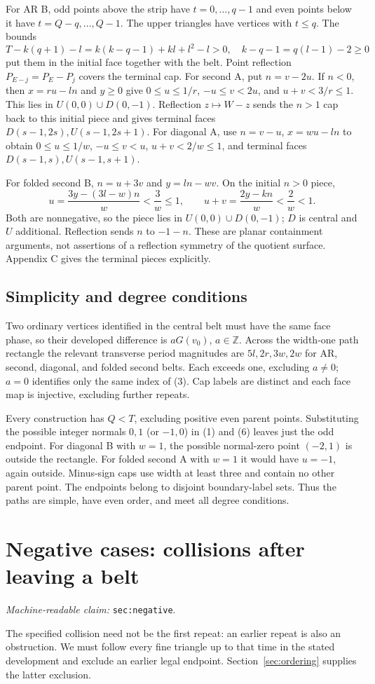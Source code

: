 \documentclass[11pt]{amsart}
\newcommand{\Z}{\mathbb Z}
\newcommand{\record}[1]{\nolinkurl{#1}}
\newcommand{\claimid}[1]{\par\nopagebreak\noindent\textit{Machine-readable claim:} \record{#1}.\par}
\begin{document}
For AR B, odd points above the strip have $t=0,\ldots,q-1$ and even
points below it have $t=Q-q,\ldots,Q-1$. The upper triangles have
vertices with $t\le q$. The bounds
\[
 T-k(q+1)-l=k(k-q-1)+kl+l^2-l>0,\quad
 k-q-1=q(l-1)-2\ge0
\]
put them in the initial face together with the belt. Point reflection
$P_{E-j}=P_E-P_j$ covers the terminal cap.
For second A, put $n=v-2u$. If $n<0$, then $x=ru-ln$ and $y\ge0$
give $0\le u\le1/r$, $-u\le v<2u$, and $u+v<3/r\le1$.
This lies in $U(0,0)\cup D(0,-1)$. Reflection $z\mapsto W-z$ sends
the $n>1$ cap back to this initial piece and gives terminal faces
$D(s-1,2s),U(s-1,2s+1)$.
For diagonal A, use $n=v-u$, $x=wu-ln$ to obtain
$0\le u\le1/w$, $-u\le v<u$, $u+v<2/w\le1$, and terminal faces
$D(s-1,s),U(s-1,s+1)$.

For folded second B, $n=u+3v$ and $y=ln-wv$. On the initial $n>0$
piece,
\[
 u=\frac{3y-(3l-w)n}{w}<\frac3w\le1,\qquad
 u+v=\frac{2y-kn}{w}<\frac2w<1.
\]
Both are nonnegative, so the piece lies in $U(0,0)\cup D(0,-1)$;
$D$ is central and $U$ additional. Reflection sends $n$ to $-1-n$.
These are planar containment arguments, not assertions of a reflection
symmetry of the quotient surface. Appendix C gives the terminal pieces
explicitly.

\subsection{Simplicity and degree conditions}
Two ordinary vertices identified in the central belt must have the
same face phase, so their developed difference is $aG(v_0)$,
$a\in\Z$. Across the width-one path rectangle the relevant transverse
period magnitudes are $5l,2r,3w,2w$ for AR, second, diagonal, and folded
second belts. Each exceeds one, excluding $a\ne0$; $a=0$ identifies
only the same index of (3). Cap labels are distinct and each face map
is injective, excluding further repeats.

Every construction has $Q<T$, excluding positive even parent points.
Substituting the possible integer normals $0,1$ (or $-1,0$) in (1)
and (6) leaves just the odd endpoint. For diagonal B with $w=1$, the
possible normal-zero point $(-2,1)$ is outside the rectangle. For
folded second A with $w=1$ it would have $u=-1$, again outside.
Minus-sign caps use width at least three and contain no other parent
point. The endpoints belong to disjoint boundary-label sets. Thus the
paths are simple, have even order, and meet all degree conditions.

\section{Negative cases: collisions after leaving a belt}\label{sec:negative}
\claimid{sec:negative}
The specified collision need not be the first repeat: an earlier
repeat is also an obstruction. We must follow every fine triangle up
to that time in the stated development and exclude an earlier legal
endpoint. Section~\ref{sec:ordering} supplies the latter exclusion.
\end{document}
